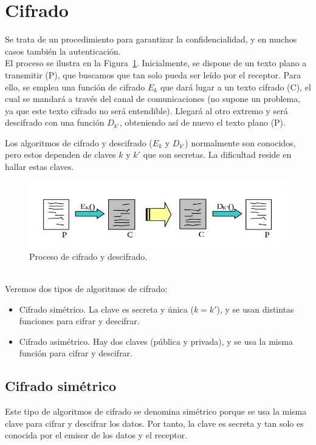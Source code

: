 \section{Cifrado}
Se trata de un procedimiento para garantizar la confidencialidad, y en muchos casos también la autenticación.\\


El proceso se ilustra en la Figura~\ref{fig:cifrado/descifrado}. Inicialmente, se dispone de un texto plano a transmitir (P), que buscamos que tan solo pueda ser leído por el receptor. Para ello, se emplea una función de cifrado $E_k$ que dará lugar a un texto cifrado (C), el cual se mandará a través del canal de comunicaciones (no supone un problema, ya que este texto cifrado no será entendible). Llegará al otro extremo y será descifrado con una función $D_{k'}$, obteniendo así de nuevo el texto plano (P).

Los algoritmos de cifrado y descifrado ($E_k$ y $D_{k'}$) normalmente son conocidos, pero estos dependen de claves $k$ y $k'$ que son secretas. La dificultad reside en hallar estas claves.
\begin{figure}
    \centering
    \includegraphics[width=1\linewidth]{./images/cifrado.png}
    \caption{Proceso de cifrado y descifrado.}
    \label{fig:cifrado/descifrado}
\end{figure}~\\

Veremos dos tipos de algoritmos de cifrado:
\begin{itemize}
    \item Cifrado simétrico. La clave es secreta y única ($k=k'$), y se usan distintas funciones para cifrar y descifrar.
    \item Cifrado asimétrico. Hay dos claves (pública y privada), y se usa la misma función para cifrar y descifrar.
\end{itemize}

\subsection{Cifrado simétrico}

Este tipo de algoritmos de cifrado se denomina simétrico porque se usa la misma clave para cifrar y descifrar los datos. Por tanto, la clave es secreta y tan solo es conocida por el emisor de los datos y el receptor.

